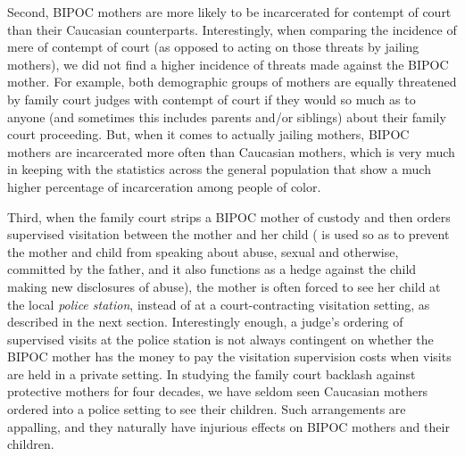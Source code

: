 Second, BIPOC mothers are more likely to be incarcerated for contempt of court than their Caucasian counterparts. Interestingly, when comparing the incidence of mere
 of contempt of court (as opposed to acting on those threats
by jailing mothers), we did not find a higher incidence of threats made
against the BIPOC mother. For example, both demographic groups of
mothers are equally threatened by family court judges with contempt of
court if they would so much as  to anyone (and sometimes this
includes parents and/or siblings) about their family court proceeding.
But, when it comes to actually jailing mothers, BIPOC mothers are incarcerated more often than Caucasian mothers, which is very much in
keeping with the statistics across the general population that show a much
higher percentage of incarceration among people of color. \pfl{}

Third, when the family court strips a BIPOC mother of custody and then
orders supervised visitation between the mother and her child ( is used so as to prevent the mother and child from speaking
about abuse, sexual and otherwise, committed by the father, and it also
functions as a hedge against the child making new 
disclosures of abuse), the mother is often forced to see her
child at the local \textit{police station}, instead of at a court-contracting visitation setting, as described in the next section. Interestingly enough, a
judge's ordering of supervised visits at the police station is not always
contingent on whether the BIPOC mother has the 
money to pay the visitation supervision costs when visits are 
held in a private setting. In
studying the family court backlash against protective mothers for 
four decades, we have seldom seen Caucasian mothers ordered into
a police setting to see their children. Such arrangements are appalling,
and they naturally have injurious effects on BIPOC mothers and their
children. \pfl{}

